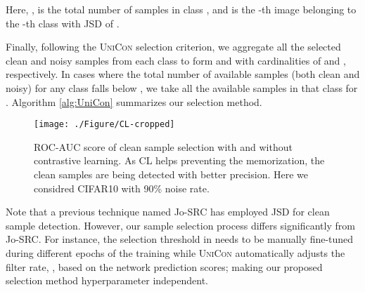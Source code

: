 \documentclass[10pt,twocolumn,letterpaper]{article}
\begin{document}
\noindent Here, ,  is the total number of samples in class , and  is the -th image belonging to the -th class with JSD of . 


Finally, following the \textsc{UniCon} selection criterion, we aggregate all the selected clean and noisy samples from each class to form  and  with cardinalities of  and , respectively. In cases where the total number of available samples (both clean and noisy) for any class falls below , we take all the available samples in that class for . Algorithm \ref{alg:UniCon} summarizes our selection method.        
\begin{figure}[t]
\vspace{2mm}
\centering
\texttt{[image: ./Figure/CL-cropped]}
\vspace{-2mm}
\caption{ROC-AUC score of clean sample selection with and without contrastive learning. As CL helps preventing the memorization, the clean samples are being detected with better precision. Here we considred CIFAR10 with 90\% noise rate. 
}
\label{fig:precision_con}
\vspace{-1mm}
\end{figure}
Note that a previous technique named Jo-SRC \cite{yao2021jo} has employed JSD for clean sample detection. However, our sample selection process differs significantly from Jo-SRC. For instance, the selection threshold in \cite{yao2021jo} needs to be manually fine-tuned during different epochs of the training while \textsc{UniCon} automatically adjusts the filter rate, , based on the network prediction scores; making our proposed selection method hyperparameter independent. 
\end{document}
